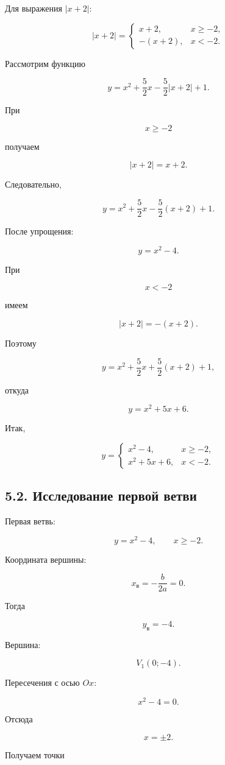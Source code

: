 \documentclass[a4paper,12pt]{article}
\begin{document}
Для выражения \(|x+2|\):

\[
|x+2|
=
\begin{cases}
x+2, & x\ge-2,\\
-(x+2), & x<-2.
\end{cases}
\]

Рассмотрим функцию

\[
y
=
x^2+\frac52x-\frac52|x+2|+1.
\]

При

\[
x\ge-2
\]

получаем

\[
|x+2|=x+2.
\]

Следовательно,

\[
y
=
x^2+\frac52x
-\frac52(x+2)+1.
\]

После упрощения:

\[
y=x^2-4.
\]

При

\[
x<-2
\]

имеем

\[
|x+2|=-(x+2).
\]

Поэтому

\[
y
=
x^2+\frac52x
+\frac52(x+2)+1,
\]

откуда

\[
y=x^2+5x+6.
\]

Итак,

\[
\boxed{
y=
\begin{cases}
x^2-4, & x\ge-2,\\
x^2+5x+6, & x<-2.
\end{cases}
}
\]

\subsection*{5.2. Исследование первой ветви}

Первая ветвь:

\[
y=x^2-4,
\qquad
x\ge-2.
\]

Координата вершины:

\[
x_{\text{в}}
=
-\frac{b}{2a}
=
0.
\]

Тогда

\[
y_{\text{в}}=-4.
\]

Вершина:

\[
V_1(0;-4).
\]

Пересечения с осью \(Ox\):

\[
x^2-4=0.
\]

Отсюда

\[
x=\pm2.
\]

Получаем точки
\end{document}

